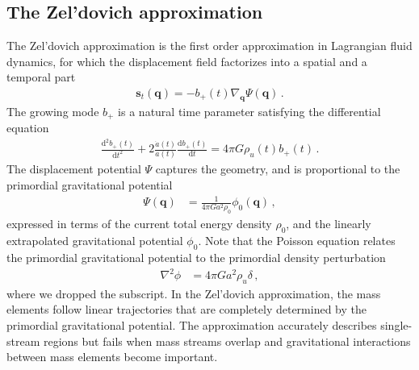 \documentclass[a4paper, 11pt]{article}
\begin{document}
\subsection{The Zel'dovich approximation}
The Zel'dovich approximation is the first order approximation in Lagrangian fluid dynamics, for which the displacement field factorizes into a spatial and a temporal part
\begin{align}
\bm{s}_t(\bm{q}) = - b_+(t) \nabla_{\bm{q}} \Psi(\bm{q})\,.
\end{align}
The growing mode $b_+$ is a natural time parameter satisfying the differential equation
\begin{align}
\frac{\mathrm{d}^2 b_+(t)}{\mathrm{d}t^2} + 2 \frac{\dot{a}(t)}{a(t)} \frac{\mathrm{d} b_+(t)}{\mathrm{d}t} = 4 \pi G \rho_u(t) b_+(t)\,.
\end{align}
The displacement potential $\Psi$ captures the geometry, and is proportional to the primordial gravitational potential
\begin{align}
\Psi(\bm{q}) &=\frac{1}{4 \pi G a^2 \rho_0}\phi_0(\bm{q})%
\,,
\end{align}
expressed in terms of the current total energy density %
$\rho_0$,
and the linearly extrapolated gravitational potential $\phi_0$. Note that the Poisson equation relates the primordial gravitational potential to the primordial density perturbation
\begin{align}
\nabla ^2 \phi &= 4 \pi G a^2 \rho_u \delta\,,%
\end{align}
where we dropped the subscript. In the Zel'dovich approximation, the mass elements follow linear trajectories that are completely determined by the primordial gravitational potential. The approximation accurately describes single-stream regions but fails when mass streams overlap and gravitational interactions between mass elements become important.
\end{document}
